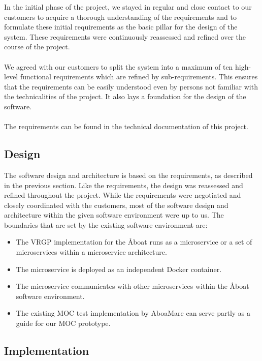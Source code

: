 In the initial phase of the project, we stayed in regular and close contact to our customers to acquire a thorough understanding of the requirements and to formulate these initial requirements as the basic pillar for the design of the system. These requirements were continuously reassessed and refined over the course of the project.
\\\\
We agreed with our customers to split the system into a maximum of ten high-level functional requirements which are refined by sub-requirements. This ensures that the requirements can be easily understood even by persons not familiar with the technicalities of the project. It also lays a foundation for the design of the software.
\\\\
The requirements can be found in the technical documentation of this project.

\subsection{Design}\label{sec:design}

The software design and architecture is based on the requirements, as described in the previous section. Like the requirements, the design was reassessed and refined throughout the project. While the requirements were negotiated and closely coordinated with the customers, most of the software design and architecture within the given software environment were up to us. The boundaries that are set by the existing software environment are:

\begin{itemize}
	\item The VRGP implementation for the Åboat runs as a microservice or a set of microservices within a microservice architecture.
	\item The microservice is deployed as an independent Docker container.
	\item The microservice communicates with other microservices within the Åboat software environment.
	\item The existing MOC test implementation by AboaMare can serve partly as a guide for our MOC prototype.
\end{itemize}

\subsection{Implementation}\label{sec:implementation}

